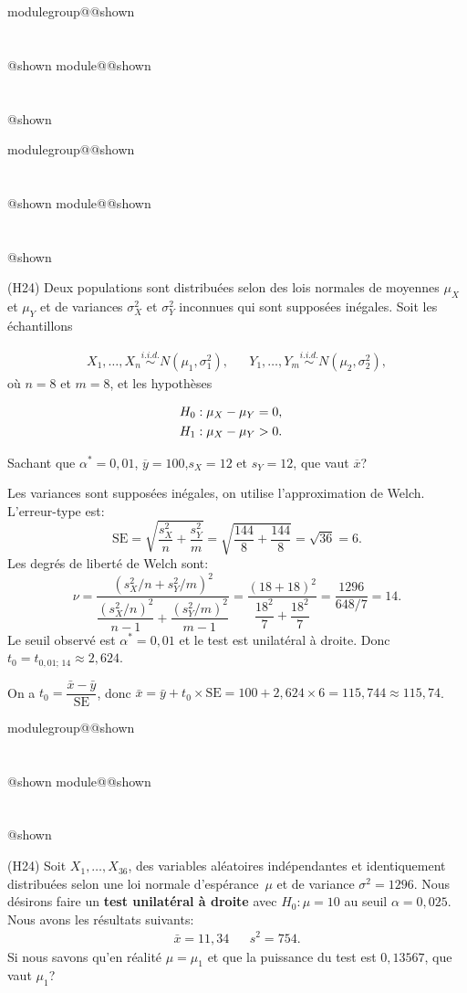 \documentclass{Evaluation}
\makeatletter
\newcommand{\currentmodulekey}{}
\newcommand{\currentmoduletitle}{}
\newcommand{\currentgroupkey}{}
\newcommand{\currentgrouptitle}{}
\newcommand{\showmoduleifneeded}{%
  \ifx\currentgroupkey\empty\else
    \expandafter\ifx\csname modulegroup@\currentgroupkey @shown\endcsname\relax
      \section*{\currentgrouptitle}%
      \expandafter\gdef\csname modulegroup@\currentgroupkey @shown\endcsname{1}%
    \fi
  \fi
  \expandafter\ifx\csname module@\currentmodulekey @shown\endcsname\relax
    \section*{\currentmoduletitle}%
    \expandafter\gdef\csname module@\currentmodulekey @shown\endcsname{1}%
  \fi
}
\newenvironment{H24}{\showmoduleifneeded}{}
\makeatother
\begin{document}
\begin{questions}
\begin{H24}
\begin{parts}
\end{parts}
\end{H24}

\begin{H24}
\question (H24)
Deux populations sont distribuées selon des lois normales de moyennes $\mu_X$ et $\mu_Y$ et de variances $\sigma^2_X$ et $\sigma^2_Y$ inconnues qui sont supposées inégales. Soit les échantillons

\begin{align*}
X_{1}, \ldots, X_{n} \overset{i.i.d.}{\sim} N(\mu_1, \sigma^2_1), & & Y_{1}, \ldots, Y_{m} \overset{i.i.d.}{\sim} N(\mu_2, \sigma^2_2),
\end{align*}
où $n=8$ et $m=8$, et les hypothèses

\begin{align*}
	H_0 &: \mu_X - \mu_Y = 0, \cr
	H_1 &: \mu_X - \mu_Y > 0.
\end{align*}

Sachant que $\alpha^*=0,01$, $\overline{y}=100 $,$s_X=12$ et $s_Y=12$, que vaut $\overline{x}$?

\begin{solution}
Les variances sont supposées inégales, on utilise l'approximation de Welch. L'erreur-type est:
\[
\text{SE} = \sqrt{\frac{s_X^2}{n} + \frac{s_Y^2}{m}} = \sqrt{\frac{144}{8} + \frac{144}{8}} = \sqrt{36} = 6.
\]
Les degrés de liberté de Welch sont:
\[
\nu = \frac{(s_X^2/n + s_Y^2/m)^2}{\dfrac{(s_X^2/n)^2}{n-1} + \dfrac{(s_Y^2/m)^2}{m-1}} = \frac{(18+18)^2}{\dfrac{18^2}{7} + \dfrac{18^2}{7}} = \frac{1296}{648/7} = 14.
\]
Le seuil observé est $\alpha^* = 0{,}01$ et le test est unilatéral à droite. Donc $t_0 = t_{0{,}01;\,14} \approx 2{,}624$.

On a $t_0 = \dfrac{\bar{x} - \bar{y}}{\text{SE}}$, donc $\bar{x} = \bar{y} + t_0 \times \text{SE} = 100 + 2{,}624 \times 6 = 115{,}744 \approx 115{,}74$.
\end{solution}
\end{H24}

\begin{H24}
\question (H24) Soit $X_1,\hdots, X_{36}$, des variables aléatoires indépendantes et identiquement distribuées selon une loi normale d'espérance~$\mu$ et de variance $\sigma^2=1296$.
Nous désirons faire un \textbf{test unilatéral à droite} avec $H_0:\mu=10$ au seuil $\alpha = 0,025$.
Nous avons les résultats suivants:
\begin{align*}
    \bar{x}= 11,34 &  & s^2=754.
\end{align*}
Si nous savons qu'en réalité $\mu=\mu_1$ et que la puissance du test est $0,13567$, que vaut $\mu_1$?


\end{H24}
\end{questions}
\end{document}
